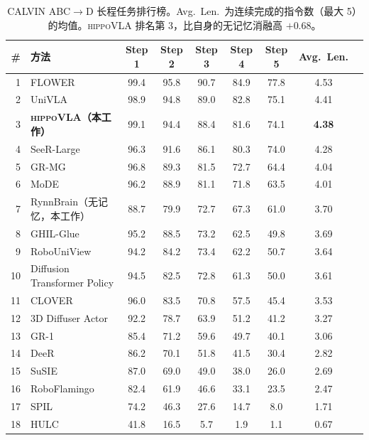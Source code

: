 \documentclass[10pt,letterpaper,fontset=fandol]{ctexart}
\newcommand{\method}{\textsc{hippoVLA}\xspace}
\begin{document}
\begin{table}[t]
\centering
\small
\caption{CALVIN ABC$\rightarrow$D 长程任务排行榜。Avg.\ Len.\ 为连续完成的指令数（最大 5）的均值。\method 排名第 3，比自身的无记忆消融高 $+0.68$。}
\label{tab:calvin}
\begin{tabular}{rlcccccc c}
\toprule
\# & 方法 & Step 1 & Step 2 & Step 3 & Step 4 & Step 5 & Avg.\ Len. \\
\midrule
1 & FLOWER                          & 99.4 & 95.8 & 90.7 & 84.9 & 77.8 & 4.53 \\
2 & UniVLA                          & 98.9 & 94.8 & 89.0 & 82.8 & 75.1 & 4.41 \\
3 & \textbf{\method（本工作）}      & 99.1 & 94.4 & 88.4 & 81.6 & 74.1 & \textbf{4.38} \\
4 & SeeR-Large                      & 96.3 & 91.6 & 86.1 & 80.3 & 74.0 & 4.28 \\
5 & GR-MG                           & 96.8 & 89.3 & 81.5 & 72.7 & 64.4 & 4.04 \\
6 & MoDE                            & 96.2 & 88.9 & 81.1 & 71.8 & 63.5 & 4.01 \\
7 & RynnBrain（无记忆，本工作）      & 88.7 & 79.9 & 72.7 & 67.3 & 61.0 & 3.70 \\
8 & GHIL-Glue                       & 95.2 & 88.5 & 73.2 & 62.5 & 49.8 & 3.69 \\
9 & RoboUniView                     & 94.2 & 84.2 & 73.4 & 62.2 & 50.7 & 3.64 \\
10 & Diffusion Transformer Policy   & 94.5 & 82.5 & 72.8 & 61.3 & 50.0 & 3.61 \\
11 & CLOVER                         & 96.0 & 83.5 & 70.8 & 57.5 & 45.4 & 3.53 \\
12 & 3D Diffuser Actor              & 92.2 & 78.7 & 63.9 & 51.2 & 41.2 & 3.27 \\
13 & GR-1                           & 85.4 & 71.2 & 59.6 & 49.7 & 40.1 & 3.06 \\
14 & DeeR                           & 86.2 & 70.1 & 51.8 & 41.5 & 30.4 & 2.82 \\
15 & SuSIE                          & 87.0 & 69.0 & 49.0 & 38.0 & 26.0 & 2.69 \\
16 & RoboFlamingo                   & 82.4 & 61.9 & 46.6 & 33.1 & 23.5 & 2.47 \\
17 & SPIL                           & 74.2 & 46.3 & 27.6 & 14.7 &  8.0 & 1.71 \\
18 & HULC                           & 41.8 & 16.5 &  5.7 &  1.9 &  1.1 & 0.67 \\
\bottomrule
\end{tabular}
\end{table}
\end{document}
